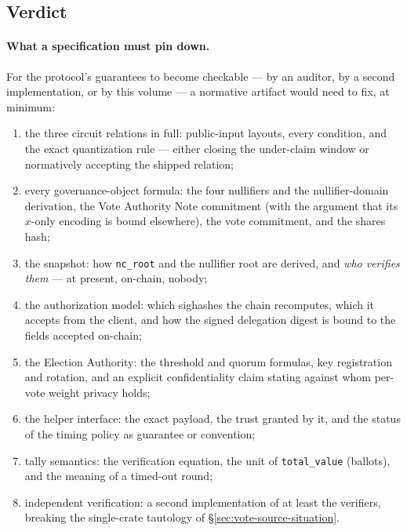 \documentclass[11pt,a4paper]{article}
\theoremstyle{definition}
\begin{document}
\subsection{Verdict}\label{sec:vote-verdict}

\paragraph{What a specification must pin down.} For the protocol's
guarantees to become checkable --- by an auditor, by a second
implementation, or by this volume --- a normative artifact would need to
fix, at minimum:
\begin{enumerate}[itemsep=1pt]
\item the three circuit relations in full: public-input layouts, every
  condition, and the exact quantization rule --- either closing the
  under-claim window or normatively accepting the shipped relation;
\item every governance-object formula: the four nullifiers and the
  nullifier-domain derivation, the Vote Authority Note commitment
  (with the argument that its $x$-only encoding is bound elsewhere), the
  vote commitment, and the shares hash;
\item the snapshot: how \texttt{nc\_root} and the nullifier root are
  derived, and \emph{who verifies them} --- at present, on-chain, nobody;
\item the authorization model: which sighashes the chain recomputes,
  which it accepts from the client, and how the signed delegation digest
  is bound to the fields accepted on-chain;
\item the Election Authority: the threshold and quorum formulas, key
  registration and rotation, and an
  explicit confidentiality claim stating against whom per-vote weight
  privacy holds;
\item the helper interface: the exact payload, the trust granted by it,
  and the status of the timing policy as guarantee or convention;
\item tally semantics: the verification equation, the unit of
  \texttt{total\_value} (ballots), and the meaning of a timed-out round;
\item independent verification: a second implementation of at least the
  verifiers, breaking the single-crate tautology of
  \S\ref{sec:vote-source-situation}.
\end{enumerate}
\end{document}
